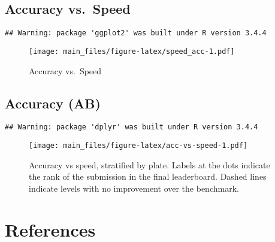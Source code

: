 \documentclass[]{article}
\begin{document}
\hypertarget{accuracy-vs.-speed}{%
\subsection{Accuracy vs.~Speed}\label{accuracy-vs.-speed}}

\begin{verbatim}
## Warning: package 'ggplot2' was built under R version 3.4.4
\end{verbatim}

\begin{figure}
\centering
\texttt{[image: main\_files/figure-latex/speed\_acc-1.pdf]}
\caption{\label{speed_acc}Accuracy vs.~Speed}
\end{figure}

\hypertarget{accuracy-ab}{%
\subsection{Accuracy (AB)}\label{accuracy-ab}}

\begin{verbatim}
## Warning: package 'dplyr' was built under R version 3.4.4
\end{verbatim}

\begin{figure}
\centering
\texttt{[image: main\_files/figure-latex/acc-vs-speed-1.pdf]}
\caption{Accuracy vs speed, stratified by plate. Labels at the dots
indicate the rank of the submission in the final leaderboard. Dashed
lines indicate levels with no improvement over the benchmark.}
\end{figure}

\hypertarget{references}{%
\section{References}\label{references}}
\end{document}
